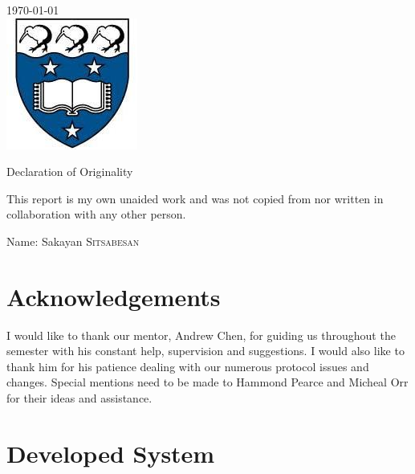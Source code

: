 \documentclass[a4paper,10pt,twoside]{article}
\begin{document}
\begin{titlepage}
{\large \today}\\[2cm] %


\includegraphics{uoa.png}\\[1cm] %
 

\vfill %

\vspace*{25em}

{\Large Declaration of Originality}

\hspace{5em}

This report is my own unaided work and was not copied from 
nor written in collaboration with any other person.

Name: Sakayan \textsc{Sitsabesan}

\end{titlepage}

\section*{Acknowledgements}

I would like to thank our mentor, Andrew Chen, for guiding us throughout the semester with his constant help, supervision and suggestions. I would also like to thank him for his patience dealing with our numerous protocol issues and changes. Special mentions need to be made to Hammond Pearce and Micheal Orr for their ideas and assistance.

\newpage

\section{Developed System}
\end{document}
